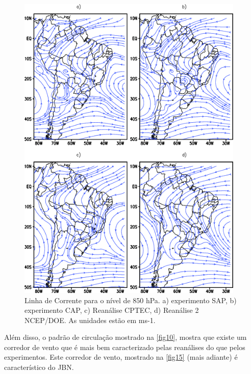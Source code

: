 \begin{figure}[!hbp]
\centering
\includegraphics[height=15cm]{./figs/media_corrente_anl_850hPa.png}
\caption{Linha de Corrente para o nível de 850 hPa. a) experimento SAP, b) experimento CAP, c) Reanálise CPTEC, d) Reanálise 2 NCEP/DOE. As unidades estão em ms-1.}
\label{fig10}
\end{figure}

Além disso, o padrão de circulação mostrado na \autoref{fig10}, mostra que existe um corredor de vento que é mais bem caracterizado pelas reanálises do que pelos experimentos. Este corredor de vento, mostrado na \autoref{fig15} (mais adiante) é característico do JBN. 

